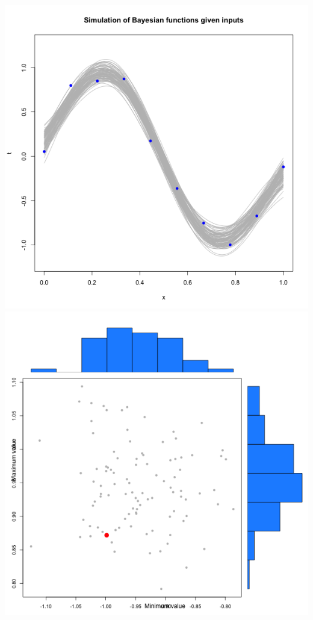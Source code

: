 \documentclass[a4paper, 11pt]{article}\usepackage[]{graphicx}\usepackage[]{color}
\begin{document}
\begin{center}
\includegraphics[scale=0.6]{ps2_plot4.png}
\includegraphics[scale=0.5]{ps2_plot5.png}
\end{center}
\end{document}
